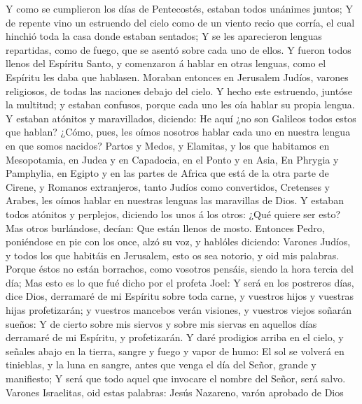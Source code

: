  Y como se cumplieron los días de Pentecostés, estaban
todos unánimes juntos;  Y de repente vino un estruendo del
cielo como de un viento recio que corría, el cual hinchió toda la casa
donde estaban sentados;  Y se les aparecieron lenguas
repartidas, como de fuego, que se asentó sobre cada uno de ellos.
 Y fueron todos llenos del Espíritu Santo, y comenzaron á
hablar en otras lenguas, como el Espíritu les daba que hablasen.
 Moraban entonces en Jerusalem Judíos, varones religiosos,
de todas las naciones debajo del cielo.  Y hecho este
estruendo, juntóse la multitud; y estaban confusos, porque cada uno les
oía hablar su propia lengua.  Y estaban atónitos y
maravillados, diciendo: He aquí ¿no son Galileos todos estos que hablan?
 ¿Cómo, pues, les oímos nosotros hablar cada uno en
nuestra lengua en que somos nacidos?  Partos y Medos, y
Elamitas, y los que habitamos en Mesopotamia, en Judea y en Capadocia,
en el Ponto y en Asia,  En Phrygia y Pamphylia, en Egipto
y en las partes de Africa que está de la otra parte de Cirene, y Romanos
extranjeros, tanto Judíos como convertidos,  Cretenses y
Arabes, les oímos hablar en nuestras lenguas las maravillas de Dios.
 Y estaban todos atónitos y perplejos, diciendo los unos
á los otros: ¿Qué quiere ser esto?  Mas otros burlándose,
decían: Que están llenos de mosto.  Entonces Pedro,
poniéndose en pie con los once, alzó su voz, y hablóles diciendo:
Varones Judíos, y todos los que habitáis en Jerusalem, esto os sea
notorio, y oid mis palabras.  Porque éstos no están
borrachos, como vosotros pensáis, siendo la hora tercia del día;
 Mas esto es lo que fué dicho por el profeta Joel:
 Y será en los postreros días, dice Dios, derramaré de mi
Espíritu sobre toda carne, y vuestros hijos y vuestras hijas
profetizarán; y vuestros mancebos verán visiones, y vuestros viejos
soñarán sueños:  Y de cierto sobre mis siervos y sobre
mis siervas en aquellos días derramaré de mi Espíritu, y profetizarán.
 Y daré prodigios arriba en el cielo, y señales abajo en
la tierra, sangre y fuego y vapor de humo:  El sol se
volverá en tinieblas, y la luna en sangre, antes que venga el día del
Señor, grande y manifiesto;  Y será que todo aquel que
invocare el nombre del Señor, será salvo.  Varones
Israelitas, oid estas palabras: Jesús Nazareno, varón aprobado de Dios
